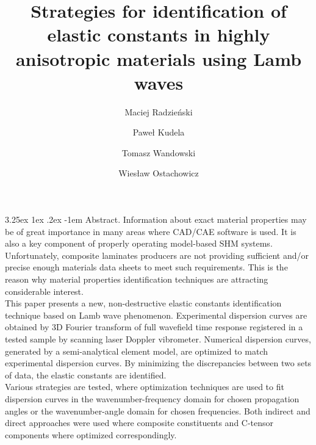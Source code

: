 \documentclass[runningheads]{llncs}
\makeatletter
\renewcommand\paragraph{\@startsection{paragraph}{4}{\z@}%
                                    {3.25ex \@plus1ex \@minus.2ex}%
                                    {-1em}%
                                    {\normalfont\normalsize\bfseries}}
\makeatother
\begin{document}
%
\title{Strategies for identification of elastic constants in highly anisotropic materials using Lamb waves}
%
%
\author{Maciej Radzieński \and
Paweł Kudela  \and 
Tomasz Wandowski 
\and Wiesław Ostachowicz
}
%
%
%
\maketitle              %
%
\paragraph{Abstract.}
Information about exact material properties may be of great importance in many areas where CAD/CAE software is used. It is also a key component of properly operating model-based SHM systems. Unfortunately, composite laminates producers are not providing sufficient and/or precise enough materials data sheets to meet such requirements. This is the reason why material properties identification techniques are attracting considerable interest.
\\
This paper presents a new, non-destructive elastic constants identification technique based on Lamb wave phenomenon. Experimental dispersion curves are obtained by 3D Fourier transform of full wavefield time response registered in a tested sample by scanning laser Doppler vibrometer. Numerical dispersion curves, generated by a semi-analytical element model, are optimized to match experimental dispersion curves. By minimizing the discrepancies between two sets of data, the elastic constants are identified. 
\\
Various strategies are tested, where optimization techniques are used to fit dispersion curves in the wavenumber-frequency domain for chosen propagation angles or the wavenumber-angle domain for chosen frequencies. Both indirect and direct approaches were used where composite constituents and C-tensor components where optimized correspondingly.
\end{document}
